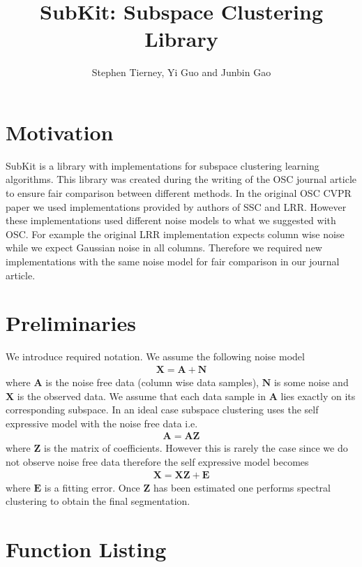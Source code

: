 \documentclass{article}
\begin{document}
\title{SubKit: Subspace Clustering Library}
\author{Stephen Tierney, Yi Guo and Junbin Gao}
\maketitle

\tableofcontents

\newpage
\section{Motivation}

SubKit is a library with implementations for subspace clustering learning algorithms. This library was created during the writing of the OSC journal article to ensure fair comparison between different methods. In the original OSC CVPR paper we used implementations provided by authors of SSC and LRR. However these implementations used different noise models to what we suggested with OSC. For example the original LRR implementation expects column wise noise while we expect Gaussian noise in all columns. Therefore we required new implementations with the same noise model for fair comparison in our journal article.

\section{Preliminaries}

We introduce required notation. We assume the following noise model
\begin{align}
\mathbf{X = A + N}
\end{align}
where $\mathbf A$ is the noise free data (column wise data samples), $\mathbf N$ is some noise and $\mathbf X$ is the observed data. We assume that each data sample in $\mathbf A$ lies exactly on its corresponding subspace. In an ideal case subspace clustering uses the self expressive model with the noise free data i.e.\
\begin{align}
\mathbf{A = AZ}
\end{align}
where $\mathbf Z$ is the matrix of coefficients. However this is rarely the case since we do not observe noise free data therefore the self expressive model becomes 
\begin{align}
\mathbf{X = XZ + E}
\end{align}
where $\mathbf E$ is a fitting error. Once $\mathbf Z$ has been estimated one performs spectral clustering to obtain the final segmentation.

\newpage
\section{Function Listing}
\end{document}
